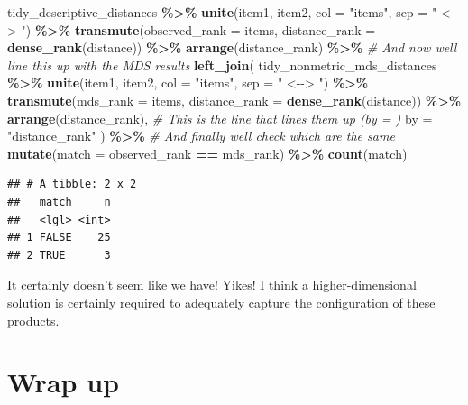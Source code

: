 \documentclass[
]{book}
\newenvironment{Shaded}{\begin{snugshade}}{\end{snugshade}}
\newcommand{\AttributeTok}[1]{\textcolor[rgb]{0.13,0.29,0.53}{#1}}
\newcommand{\CommentTok}[1]{\textcolor[rgb]{0.56,0.35,0.01}{\textit{#1}}}
\newcommand{\FunctionTok}[1]{\textcolor[rgb]{0.13,0.29,0.53}{\textbf{#1}}}
\newcommand{\NormalTok}[1]{#1}
\newcommand{\SpecialCharTok}[1]{\textcolor[rgb]{0.81,0.36,0.00}{\textbf{#1}}}
\newcommand{\StringTok}[1]{\textcolor[rgb]{0.31,0.60,0.02}{#1}}
\begin{document}
\begin{Shaded}
\begin{Highlighting}[]
\NormalTok{tidy\_descriptive\_distances }\SpecialCharTok{\%\textgreater{}\%}
  \FunctionTok{unite}\NormalTok{(item1, item2, }\AttributeTok{col =} \StringTok{"items"}\NormalTok{, }\AttributeTok{sep =} \StringTok{" \textless{}{-}{-}\textgreater{} "}\NormalTok{) }\SpecialCharTok{\%\textgreater{}\%}
  \FunctionTok{transmute}\NormalTok{(}\AttributeTok{observed\_rank =}\NormalTok{ items,}
            \AttributeTok{distance\_rank =} \FunctionTok{dense\_rank}\NormalTok{(distance)) }\SpecialCharTok{\%\textgreater{}\%}
  \FunctionTok{arrange}\NormalTok{(distance\_rank) }\SpecialCharTok{\%\textgreater{}\%}
  \CommentTok{\# And now we\textquotesingle{}ll line this up with the MDS results}
  \FunctionTok{left\_join}\NormalTok{(}
\NormalTok{    tidy\_nonmetric\_mds\_distances }\SpecialCharTok{\%\textgreater{}\%}
      \FunctionTok{unite}\NormalTok{(item1, item2, }\AttributeTok{col =} \StringTok{"items"}\NormalTok{, }\AttributeTok{sep =} \StringTok{" \textless{}{-}{-}\textgreater{} "}\NormalTok{) }\SpecialCharTok{\%\textgreater{}\%}
      \FunctionTok{transmute}\NormalTok{(}\AttributeTok{mds\_rank =}\NormalTok{ items,}
                \AttributeTok{distance\_rank =} \FunctionTok{dense\_rank}\NormalTok{(distance)) }\SpecialCharTok{\%\textgreater{}\%}
      \FunctionTok{arrange}\NormalTok{(distance\_rank),}
    \CommentTok{\# This is the line that lines them up (\textasciigrave{}by = \textasciigrave{})}
    \AttributeTok{by =} \StringTok{"distance\_rank"}
\NormalTok{  ) }\SpecialCharTok{\%\textgreater{}\%}
  \CommentTok{\# And finally we\textquotesingle{}ll check which are the same}
  \FunctionTok{mutate}\NormalTok{(}\AttributeTok{match =}\NormalTok{ observed\_rank }\SpecialCharTok{==}\NormalTok{ mds\_rank) }\SpecialCharTok{\%\textgreater{}\%}
  \FunctionTok{count}\NormalTok{(match)}
\end{Highlighting}
\end{Shaded}

\begin{verbatim}
## # A tibble: 2 x 2
##   match     n
##   <lgl> <int>
## 1 FALSE    25
## 2 TRUE      3
\end{verbatim}

It certainly doesn't seem like we have! Yikes! I think a higher-dimensional solution is certainly required to adequately capture the configuration of these products.

\section{Wrap up}\label{wrap-up}
\end{document}

